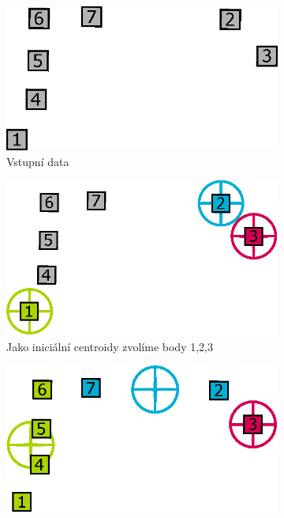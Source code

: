\begin{figure}[h]
\centering
\begin{subfigure}{.49\textwidth}
  \centering
  \includegraphics[width=.9\linewidth]{img/kmeans_emptyCluster1.eps}
  \caption{Vstupní data}
  \label{fig:kmeansemptycluster1}
\end{subfigure}
\begin{subfigure}{.49\textwidth}
  \centering
  \includegraphics[width=.9\linewidth]{img/kmeans_emptyCluster2.eps}
  \caption{Jako iniciální centroidy zvolíme body 1,2,3}
  \label{fig:kmeansemptycluster2}
\end{subfigure}
\vspace*{0.5cm} 
\begin{subfigure}{.49\textwidth}
  \centering
  \includegraphics[width=.9\linewidth]{img/kmeans_emptyCluster3.eps}

\end{subfigure}
\end{figure}
